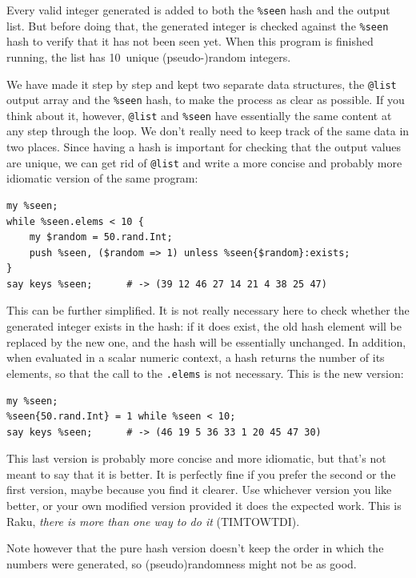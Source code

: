 Every valid integer generated is added to both the \verb'%seen' 
hash and the output list. But before doing 
that, the generated integer is checked against the 
\verb'%seen' hash to verify that it has not been seen yet. 
When this program is finished running, the list has 10~unique 
(pseudo-)random integers.

We have made it step by step and kept two separate data 
structures, the \verb'@list' output array and the 
\verb'%seen' hash, to make the process as clear as possible. 
If you think about it, however, \verb'@list' and \verb'%seen' 
have essentially the same content at any step through the 
loop. We don't really need to keep track of the same data in 
two places. Since having a hash is important for checking that the 
output values are unique, we can get rid of \verb'@list' 
and write a more concise and probably more idiomatic version 
of the same program:

\begin{verbatim}
my %seen;
while %seen.elems < 10 {
	my $random = 50.rand.Int;
	push %seen, ($random => 1) unless %seen{$random}:exists;
}
say keys %seen;      # -> (39 12 46 27 14 21 4 38 25 47)
\end{verbatim}

This can be further simplified. It is not really necessary 
here to check whether the generated integer exists in the 
hash: if it does exist, the old hash element will be replaced 
by the new one, and the hash will be essentially unchanged. In 
addition, when evaluated in a scalar numeric context, a 
hash returns the number of its elements, so that the call 
to the {\tt .elems} is not necessary. This is the new version:

\begin{verbatim}
my %seen;
%seen{50.rand.Int} = 1 while %seen < 10;
say keys %seen;      # -> (46 19 5 36 33 1 20 45 47 30)
\end{verbatim}

This last version is probably more concise and more idiomatic, 
but that's not meant to say that it is better. It is 
perfectly fine if you prefer the second or the first version, 
maybe because you find it clearer. Use whichever version you 
like better, or your own modified version provided it does 
the expected work. This is Raku, \emph{there 
is more than one way to do it} (TIMTOWTDI).

Note however that the pure hash version doesn't keep the order 
in which the numbers were generated, so (pseudo)randomness 
might not be as good.

